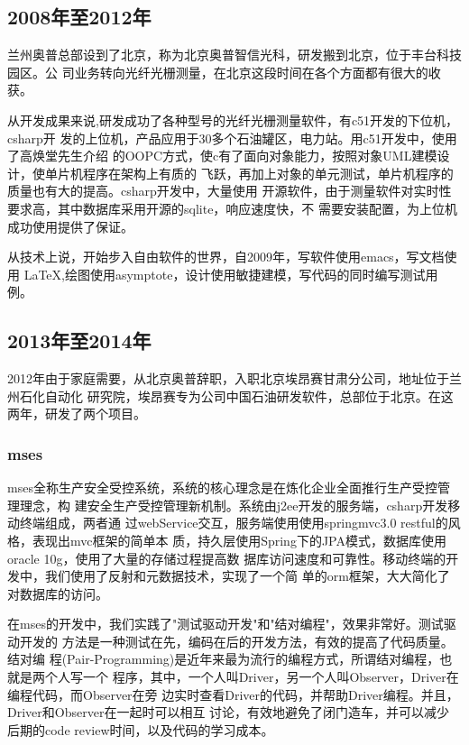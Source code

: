 \subsection{2008年至2012年}

兰州奥普总部设到了北京，称为北京奥普智信光科，研发搬到北京，位于丰台科技园区。公
司业务转向光纤光栅测量，在北京这段时间在各个方面都有很大的收获。

从开发成果来说,研发成功了各种型号的光纤光栅测量软件，有c51开发的下位机，csharp开
发的上位机，产品应用于30多个石油罐区，电力站。用c51开发中，使用了高焕堂先生介绍
的OOPC方式，使c有了面向对象能力，按照对象UML建模设计，使单片机程序在架构上有质的
飞跃，再加上对象的单元测试，单片机程序的质量也有大的提高。csharp开发中，大量使用
开源软件，由于测量软件对实时性要求高，其中数据库采用开源的sqlite，响应速度快，不
需要安装配置，为上位机成功使用提供了保证。

从技术上说，开始步入自由软件的世界，自2009年，写软件使用emacs，写文档使用
\LaTeX{},绘图使用asymptote，设计使用敏捷建模，写代码的同时编写测试用例。

\subsection{2013年至2014年}

2012年由于家庭需要，从北京奥普辞职，入职北京埃昂赛甘肃分公司，地址位于兰州石化自动化
研究院，埃昂赛专为公司中国石油研发软件，总部位于北京。在这两年，研发了两个项目。

\subsubsection{mses}

mses全称生产安全受控系统，系统的核心理念是在炼化企业全面推行生产受控管理理念，构
建安全生产受控管理新机制。系统由j2ee开发的服务端，csharp开发移动终端组成，两者通
过webService交互，服务端使用使用springmvc3.0 restful的风格，表现出mvc框架的简单本
质，持久层使用Spring下的JPA模式，数据库使用oracle 10g，使用了大量的存储过程提高数
据库访问速度和可靠性。移动终端的开发中，我们使用了反射和元数据技术，实现了一个简
单的orm框架，大大简化了对数据库的访问。

在mses的开发中，我们实践了"测试驱动开发"和"结对编程"，效果非常好。测试驱动开发的
方法是一种测试在先，编码在后的开发方法，有效的提高了代码质量。结对编
程(Pair-Programming)是近年来最为流行的编程方式，所谓结对编程，也就是两个人写一个
程序，其中，一个人叫Driver，另一个人叫Observer，Driver在编程代码，而Observer在旁
边实时查看Driver的代码，并帮助Driver编程。并且，Driver和Observer在一起时可以相互
讨论，有效地避免了闭门造车，并可以减少后期的code review时间，以及代码的学习成本。

